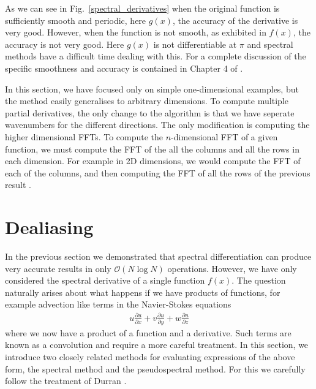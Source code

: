 As we can see in Fig.~\ref{spectral_derivatives} when the original function is sufficiently smooth and periodic, here $g(x)$, the accuracy of the derivative is very good. However, when the function is not smooth, as exhibited in $f(x)$, the accuracy is not very good. Here $g(x)$ is not differentiable at $\pi$ and spectral methods have a difficult time dealing with this. For a complete discussion of the specific smoothness and accuracy is contained in Chapter 4 of \cite{trefethen_spectral}.

In this section, we have focused only on simple one-dimensional examples, but the method easily generalises to arbitrary dimensions. To compute multiple partial derivatives, the only change to the algorithm is that we have seperate wavenumbers for the different directions. The only modification is computing the higher dimensional FFTs. To compute the $n$-dimensional FFT of a given function, we must compute the FFT of the all the columns and all the rows in each dimension\cite{kammler}. For example in 2D dimensions, we would compute the FFT of each of the columns, and then computing the FFT of all the rows of the previous result \cite{matlabfft2}. 

\section{Dealiasing} 
In the previous section we demonstrated that spectral differentiation can produce very accurate results in only $\mathcal{O}(N\log N)$ operations. However, we have only considered the spectral derivative of a single function $f(x)$. The question naturally arises about what happens if we have products of functions, for example advection like terms in the Navier-Stokes equations 
\begin{align}
u\frac{\partial u}{\partial x} + v\frac{\partial u}{\partial y} +w\frac{\partial u}{\partial z}
\end{align}
where we now have a product of a function and a derivative. Such terms are known as a convolution and require a more careful treatment. In this section, we introduce two closely related methods for evaluating expressions of the above form, the spectral method and the pseudospectral method. For this we carefully follow the treatment of Durran \cite{durran}. 

